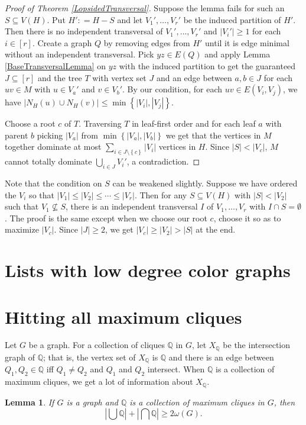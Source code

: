 \documentclass{tufte-book} %
\theoremstyle{plain}
\newtheorem{lemma}{Lemma}
\newcommand{\set}[1]{\left\{ #1 \right\}}
\newcommand{\card}[1]{\left|#1\right|}
\newcommand{\irange}[1]{\left[#1\right]}
\newcommand{\DefinedAs}{\mathrel{\mathop:}=}
\newcommand{\Q}{\mathbb{Q}}
\begin{document}
\begin{proof}[Proof of Theorem \ref{LopsidedTransversal}]
Suppose the lemma fails for such an $S \subseteq V(H)$.  Put $H' \DefinedAs H - S$ and let $V_1', \ldots, V_r'$ be the induced partition of $H'$. Then there is no independent transversal of $V_1', \ldots, V_r'$ and $\card{V_i'} \geq 1$ for each $i \in \irange{r}$. Create a graph $Q$ by removing edges from $H'$ until it is edge minimal without an independent transversal. Pick $yz \in E(Q)$ and apply Lemma 
\ref{BaseTransversalLemma} on $yz$ with the induced partition to get the guaranteed 
$J \subseteq \irange{r}$ and the tree $T$ with vertex set $J$ and an edge between $a, b \in
J$ for each $uv \in M$ with $u \in V_a'$ and $v \in V_b'$.  By our condition, for each $uv \in E(V_i, V_j)$, we have $\card{N_H(u) \cup N_H(v)} \leq \min\set{\card{V_i}, \card{V_j}}$.

Choose a root $c$ of $T$. Traversing $T$ in leaf-first order and for each leaf $a$ with parent $b$ picking $|V_a|$ from $\min\set{|V_a|, |V_b|}$ we get that the vertices in $M$ together dominate at most $\sum_{i \in J \setminus \set{c}} \card{V_i}$ vertices in $H$.  Since $\card{S} < \card{V_c}$, $M$ cannot totally dominate $\bigcup_{i \in J} V_i'$, a contradiction.
\end{proof}

Note that the condition on $S$ can be weakened slightly.  Suppose we have ordered the $V_i$ so that $\card{V_1} \leq \card{V_2} \leq \cdots \leq \card{V_r}$.  Then for any $S \subseteq V(H)$ with $\card{S} < \card{V_2}$ such that $V_1 \not \subseteq S$, there is an independent transversal $I$ of $V_1, \ldots, V_r$ with $I \cap S = \emptyset$.  The proof is the same except when we choose our root $c$, choose it so as to maximize $\card{V_c}$.  
Since $\card{J} \geq 2$, we get $\card{V_c} \geq \card{V_2} > \card{S}$ at the end.
\section{Lists with low degree color graphs}

\section{Hitting all maximum cliques}
Let $G$ be a graph. For a collection of cliques $\Q$ in $G$, let $X_\Q$ be the intersection graph of $\Q$; that is, the 
vertex set of $X_\Q$ is $\Q$ and there is an edge between $Q_1, Q_2 \in \Q$ iff $Q_1 \ne Q_2$ and $Q_1$ and $Q_2$ intersect.
When $\Q$ is a collection of maximum cliques, we get a lot of information about $X_\Q$.  
\begin{lemma}\label{HajnalLemma}
If $G$ is a graph and $\Q$ is a collection of maximum cliques in $G$, then 
\[\card{\bigcup \Q} + \card{\bigcap \Q} \geq 2\omega(G).\]
\end{lemma}
\end{document}

